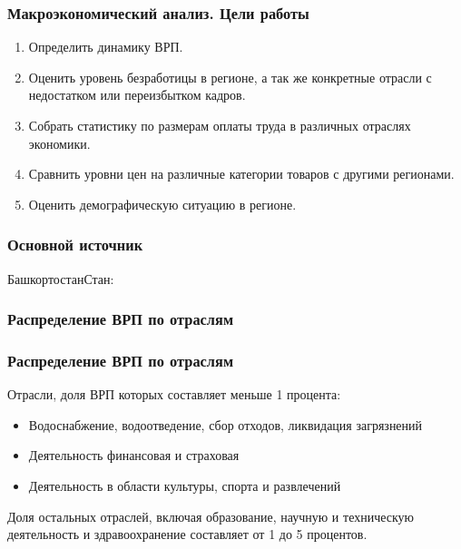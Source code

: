 \begin{frame} 
\frametitle{Макроэкономический анализ. Цели работы}

\begin{enumerate}
	\item Определить динамику ВРП.
	\item Оценить уровень безработицы в регионе, а так же конкретные отрасли с недостатком или переизбытком кадров.
	\item Собрать статистику по размерам оплаты труда в различных отраслях экономики.
	\item Сравнить уровни цен на различные категории товаров с другими регионами.
	\item Оценить демографическую ситуацию в регионе.
\end{enumerate}

\end{frame}

\begin{frame} 
\frametitle{Основной источник}

\begin{center}
\Large{БашкортостанСтан: }
\end{center}

\end{frame}

\begin{frame} 
\frametitle{Распределение ВРП по отраслям}


\end{frame}

\begin{frame} 
\frametitle{Распределение ВРП по отраслям}

Отрасли, доля ВРП которых составляет меньше 1 процента:
\begin{itemize}
	\item Водоснабжение, водоотведение, сбор отходов, ликвидация загрязнений
	\item Деятельность финансовая и страховая
	\item Деятельность в области культуры, спорта и развлечений
\end{itemize}

Доля остальных отраслей, включая образование, научную и техническую деятельность и здравоохранение составляет от 1 до 5 процентов.

\end{frame}

